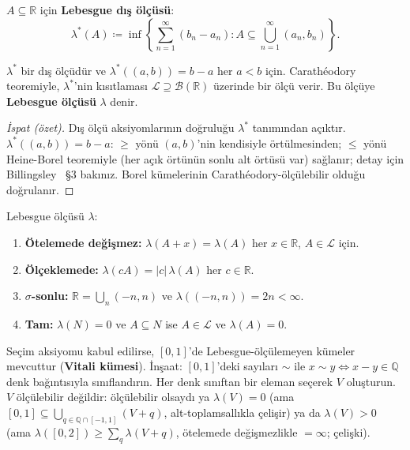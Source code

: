 \begin{tanim}\label{def:lebesgue_dis}
$A \subseteq \mathbb{R}$ için \textbf{Lebesgue dış ölçüsü}:
\[
  \lambda^*(A) \coloneqq \inf\left\{
    \sum_{n=1}^\infty (b_n - a_n) :
    A \subseteq \bigcup_{n=1}^\infty (a_n, b_n)
  \right\}.
\]
\end{tanim}

\begin{teorem}\label{thm:lebesgue_varlik}
$\lambda^*$ bir dış ölçüdür ve $\lambda^*((a,b)) = b - a$ her $a < b$ için.
Carathéodory teoremiyle, $\lambda^*$'nin kısıtlaması
$\mathcal{L} \supseteq \mathcal{B}(\mathbb{R})$ üzerinde bir ölçü verir.
Bu ölçüye \textbf{Lebesgue ölçüsü} $\lambda$ denir.
\end{teorem}

\begin{proof}[İspat (özet)]
Dış ölçü aksiyomlarının doğruluğu $\lambda^*$ tanımından açıktır.
$\lambda^*((a,b)) = b-a$: $\geq$ yönü $(a,b)$'nin kendisiyle örtülmesinden;
$\leq$ yönü Heine-Borel teoremiyle (her açık örtünün sonlu alt örtüsü var)
sağlanır; detay için Billingsley~\cite{billingsley1995} §3 bakınız.
Borel kümelerinin Carathéodory-ölçülebilir olduğu doğrulanır.
\end{proof}

\begin{onerme}\label{prop:lebesgueozell}
Lebesgue ölçüsü $\lambda$:
\begin{enumerate}[label=(\roman*)]
  \item \textbf{Ötelemede değişmez:} $\lambda(A + x) = \lambda(A)$ her $x \in \mathbb{R}$,
        $A \in \mathcal{L}$ için.
  \item \textbf{Ölçeklemede:} $\lambda(cA) = |c|\,\lambda(A)$ her $c \in \mathbb{R}$.
  \item \textbf{$\sigma$-sonlu:} $\mathbb{R} = \bigcup_n (-n,n)$ ve $\lambda((-n,n)) = 2n < \infty$.
  \item \textbf{Tam:} $\lambda(N) = 0$ ve $A \subseteq N$ ise $A \in \mathcal{L}$ ve $\lambda(A) = 0$.
\end{enumerate}
\end{onerme}

\begin{karsiornek}
Seçim aksiyomu kabul edilirse, $[0,1]$'de Lebesgue-ölçülemeyen kümeler
mevcuttur (\textbf{Vitali kümesi}). İnşaat: $[0,1]$'deki sayıları
$\sim$ ile $x \sim y \iff x - y \in \mathbb{Q}$ denk bağıntısıyla sınıflandırın.
Her denk sınıftan bir eleman seçerek $V$ oluşturun. $V$ ölçülebilir değildir:
ölçülebilir olsaydı ya $\lambda(V) = 0$ (ama $[0,1] \subseteq \bigcup_{q \in \mathbb{Q} \cap [-1,1]} (V+q)$,
alt-toplamsallıkla çelişir) ya da $\lambda(V) > 0$ (ama $\lambda([0,2]) \geq \sum_{q} \lambda(V+q)$,
ötelemede değişmezlikle $= \infty$; çelişki).
\end{karsiornek}


